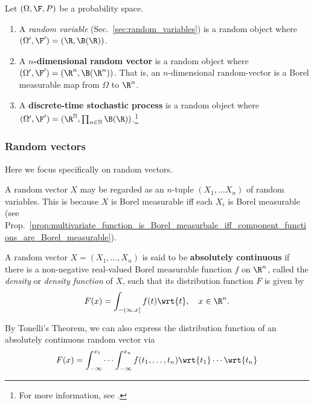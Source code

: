 \documentclass{article} %
\begin{document}
\begin{examples}
Let $(\Omega, \F, P)$ be a probability space.
\begin{enumerate}
\item A \textit{random variable} (Sec.~\ref{sec:random_variables}) is a random object where $(\Omega',\F') = (\R, \B(\R))$.
\item  A \textbf{ $n$-dimensional random vector} is a random object where $(\Omega',\F') = (\R^n, \B(\R^n))$.  That is, an $n$-dimensional random-vector is a Borel measurable map from $\Omega$ to $\R^n$.
\item A \textbf{discrete-time stochastic process} is a random object where $(\Omega',\F') = (\R^{\mathbb{N}}, \prod_{n \in \mathbb{N}} \B(\R))$.\footnote{For more information, see \cite{zitkovic2013lecture6}.}
\end{enumerate}
\end{examples}

\subsubsection{Random vectors}

Here we focus specifically on random vectors. 

\begin{remark}
A random vector $X$ may be regarded as an $n$-tuple $(X_1, \hdots X_n)$ of random variables.  This is because $X$ is Borel measurable iff each $X_i$ is Borel measurable (see Prop.~\ref{prop:multivariate_function_is_Borel_measurbale_iff_component_functions_are_Borel_measurable}).
\end{remark}

\begin{definition}{}
A random vector $X=(X_1,\hdots,X_n)$ is said to be \textbf{absolutely continuous} if there is a non-negative real-valued Borel measurable function $f$ on $\R^n$, called the \textit{density} or \textit{density function} of $X$, such that its distribution function $F$ is given by
\[ F(x) = \int_{-(\infty,x]} f(t) \wrt{t}, \quad x \in \R^n.\]
\label{def:absolutely_continuous_random_variable}
\end{definition}

\begin{remark}
By Tonelli's Theorem, we can also express the distribution function of an absolutely continuous random vector via
\[F(x) = \int_{-\infty}^{x_1} \cdots \int_{-\infty}^{x_n} f(t_1, \hdots, t_n) \wrt{t_1} \cdots \wrt{t_n} \]
\end{remark}
\end{document}
